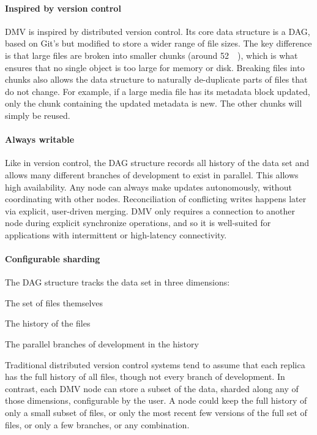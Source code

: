 

\paragraph{Inspired by version control}

\gls{DMV} is inspired by distributed version control. Its core data structure is
a DAG, based on Git's but modified to store a wider range of file sizes. The key
difference is that large files are broken into smaller chunks (around
\SI{52}{\kibi\byte}), which is what ensures that no single object is too large
for memory or disk. Breaking files into chunks also allows the data structure to
naturally de-duplicate parts of files that do not change. For example, if a
large media file has its metadata block updated, only the chunk containing the
updated metadata is new. The other chunks will simply be reused.


\paragraph{Always writable}

Like in version control, the DAG structure records all history of the data set
and allows many different branches of development to exist in parallel. This
allows high availability. Any node can always make updates autonomously, without
coordinating with other nodes. Reconciliation of conflicting writes happens
later via explicit, user-driven merging. \gls{DMV} only requires a connection to
another node during explicit synchronize operations, and so it is well-suited
for applications with intermittent or high-latency connectivity.


\paragraph{Configurable sharding}

The DAG structure tracks the data set in three dimensions:

\begin{tight_enumerate}
    \item The set of files themselves
    \item The history of the files
    \item The parallel branches of development in the history
\end{tight_enumerate}

Traditional distributed version control systems tend to assume that each replica
has the full history of all files, though not every branch of development. In
contrast, each \gls{DMV} node can store a subset of the data, sharded along any
of those dimensions, configurable by the user. A node could keep the full
history of only a small subset of files, or only the most recent few versions of
the full set of files, or only a few branches, or any combination. 


